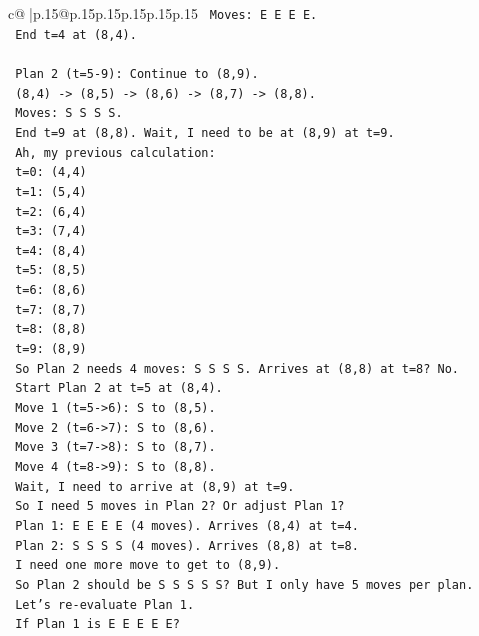 \documentclass{article}
\begin{document}
{\begin{supertabular}{c@{$\;$}|p{.15\linewidth}@{}p{.15\linewidth}p{.15\linewidth}p{.15\linewidth}p{.15\linewidth}p{.15\linewidth}}
{{{\texttt{   Moves: E E E E.} \\
\texttt{   End t=4 at (8,4).} \\
\\ 
\texttt{   Plan 2 (t=5{-}9): Continue to (8,9).} \\
\texttt{   (8,4) {-}> (8,5) {-}> (8,6) {-}> (8,7) {-}> (8,8).} \\
\texttt{   Moves: S S S S.} \\
\texttt{   End t=9 at (8,8). Wait, I need to be at (8,9) at t=9.} \\
\texttt{   Ah, my previous calculation:} \\
\texttt{   t=0: (4,4)} \\
\texttt{   t=1: (5,4)} \\
\texttt{   t=2: (6,4)} \\
\texttt{   t=3: (7,4)} \\
\texttt{   t=4: (8,4)} \\
\texttt{   t=5: (8,5)} \\
\texttt{   t=6: (8,6)} \\
\texttt{   t=7: (8,7)} \\
\texttt{   t=8: (8,8)} \\
\texttt{   t=9: (8,9)} \\
\texttt{   So Plan 2 needs 4 moves: S S S S. Arrives at (8,8) at t=8? No.} \\
\texttt{   Start Plan 2 at t=5 at (8,4).} \\
\texttt{   Move 1 (t=5{-}>6): S to (8,5).} \\
\texttt{   Move 2 (t=6{-}>7): S to (8,6).} \\
\texttt{   Move 3 (t=7{-}>8): S to (8,7).} \\
\texttt{   Move 4 (t=8{-}>9): S to (8,8).} \\
\texttt{   Wait, I need to arrive at (8,9) at t=9.} \\
\texttt{   So I need 5 moves in Plan 2? Or adjust Plan 1?} \\
\texttt{   Plan 1: E E E E (4 moves). Arrives (8,4) at t=4.} \\
\texttt{   Plan 2: S S S S (4 moves). Arrives (8,8) at t=8.} \\
\texttt{   I need one more move to get to (8,9).} \\
\texttt{   So Plan 2 should be S S S S S? But I only have 5 moves per plan.} \\
\texttt{   Let's re{-}evaluate Plan 1.} \\
\texttt{   If Plan 1 is E E E E E?} \\
}}}
\end{supertabular}}
\end{document}
